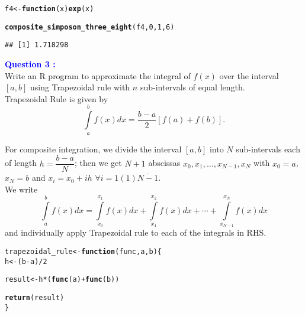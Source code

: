 \documentclass[11pt, a4paper]{article}\usepackage[]{graphicx}\usepackage[]{xcolor}
\makeatletter
\newcommand{\hlnum}[1]{\textcolor[rgb]{0.686,0.059,0.569}{#1}}%
\newcommand{\hlopt}[1]{\textcolor[rgb]{0,0,0}{#1}}%
\newcommand{\hldef}[1]{\textcolor[rgb]{0.345,0.345,0.345}{#1}}%
\newcommand{\hlkwa}[1]{\textcolor[rgb]{0.161,0.373,0.58}{\textbf{#1}}}%
\newcommand{\hlkwb}[1]{\textcolor[rgb]{0.69,0.353,0.396}{#1}}%
\newcommand{\hlkwc}[1]{\textcolor[rgb]{0.333,0.667,0.333}{#1}}%
\newcommand{\hlkwd}[1]{\textcolor[rgb]{0.737,0.353,0.396}{\textbf{#1}}}%
\newenvironment{kframe}{%
 \def\at@end@of@kframe{}%
 \ifinner\ifhmode%
  \def\at@end@of@kframe{\end{minipage}}%
  \begin{minipage}{\columnwidth}%
 \fi\fi%
 \def\FrameCommand##1{\hskip\@totalleftmargin \hskip-\fboxsep
 \colorbox{shadecolor}{##1}\hskip-\fboxsep
     \hskip-\linewidth \hskip-\@totalleftmargin \hskip\columnwidth}%
 \MakeFramed {\advance\hsize-\width
   \@totalleftmargin\z@ \linewidth\hsize
   \@setminipage}}%
 {\par\unskip\endMakeFramed%
 \at@end@of@kframe}
\newenvironment{knitrout}{}{} %
\makeatother
\begin{document}
\begin{knitrout}
\color{fgcolor}\begin{kframe}
\begin{alltt}
\hldef{f4} \hlkwb{<-} \hlkwa{function}\hldef{(}\hlkwc{x}\hldef{)} \hlkwd{exp}\hldef{(x)}

\hlkwd{composite_simposon_three_eight}\hldef{(f4,} \hlnum{0}\hldef{,} \hlnum{1}\hldef{,} \hlnum{6}\hldef{)}
\end{alltt}
\begin{verbatim}
## [1] 1.718298
\end{verbatim}
\end{kframe}
\end{knitrout}

\smallpencil \hspace{0.2cm} \textcolor{blue}{\textbf{Question 3 : }} \\

\hspace{1cm} Write an R program to approximate the integral of $f(x)$ over the interval $[a, b]$ using Trapezoidal rule with $n$ sub-intervals of equal length. \\

\faArrowAltCircleRight[regular] \hspace{0.2cm} Trapezoidal Rule is given by $$\int \limits_{a}^{b} f(x) dx = \dfrac{b-a}{2} \left[ f(a) + f(b) \right].$$

For composite integration, we divide the interval $[a, b]$ into $N$ sub-intervals each of length $h = \dfrac{b-a}{N}$; then we get $N + 1$ abscissas $x_0, x_1, \ldots, x_{N-1}, x_{N}$ with $x_0 = a$, $x_{N} = b$ and $x_i = x_0 + ih \,\, \forall i = 1(1)\overline{N-1}$. \\

We write $$\int \limits_{a}^{b} f(x) dx = \int \limits_{x_0}^{x_1} f(x) dx + \int \limits_{x_1}^{x_2} f(x) dx + \cdots + \int \limits_{x_{N-1}}^{x_{N}} f(x) dx$$ and individually apply Trapezoidal rule to each of the integrals in RHS.

\begin{knitrout}
\color{fgcolor}\begin{kframe}
\begin{alltt}
\hldef{trapezoidal_rule} \hlkwb{<-} \hlkwa{function}\hldef{(}\hlkwc{func}\hldef{,} \hlkwc{a}\hldef{,} \hlkwc{b}\hldef{)\{}
  \hldef{h} \hlkwb{<-} \hldef{(b} \hlopt{-} \hldef{a)} \hlopt{/} \hlnum{2}

  \hldef{result} \hlkwb{<-} \hldef{h} \hlopt{*} \hldef{(} \hlkwd{func}\hldef{(a)} \hlopt{+} \hlkwd{func}\hldef{(b))}

  \hlkwd{return}\hldef{(result)}
\hldef{\}}
\end{alltt}
\end{kframe}
\end{knitrout}
\end{document}
